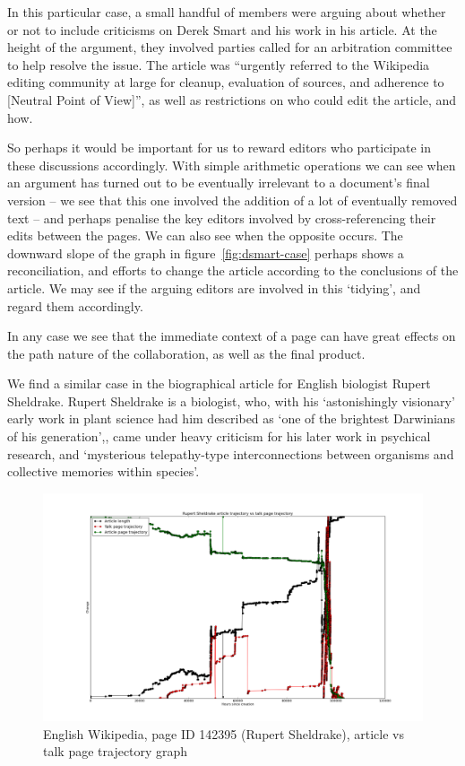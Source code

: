 In this particular case, a small handful of members were arguing about
whether or not to include criticisms on Derek Smart and his work in
his article. At the height of the argument, they involved parties
called for an arbitration committee to help resolve the issue. The
article was ``urgently referred to the Wikipedia editing community at
large for cleanup, evaluation of sources, and adherence to
[Neutral Point of View]'', as well as restrictions on who could edit
the article, and how.

So perhaps it would be important for us to reward editors who
participate in these discussions accordingly. With simple arithmetic
operations we can see when an argument has turned out to be eventually
irrelevant to a document's final version -- we see that this one
involved the addition of a lot of eventually removed text -- and
perhaps penalise the key editors involved by cross-referencing their
edits between the pages. We can also see when the opposite occurs. The
downward slope of the graph in figure~\ref{fig:dsmart-case}
perhaps shows a reconciliation, and efforts to change the article
according to the conclusions of the article. We may see if the arguing
editors are involved in this `tidying', and regard them accordingly.

In any case we see that the immediate context of a page can have great
effects on the path nature of the collaboration, as well as the final
product.

We find a similar case in the biographical article for English
biologist Rupert Sheldrake. Rupert Sheldrake is a biologist, who, with
his `astonishingly visionary' early work in plant science had him
described as `one of the brightest Darwinians of his
generation',\cite{odyssey-auxin}\cite{guardian-shel}, came under heavy
criticism for his later work in psychical research, and `mysterious
telepathy-type interconnections between organisms and collective
memories within species'.\cite{sheldrake-biog}

\begin{figure}
  \centering
  \centering
  \includegraphics[width=\linewidth]{img/rsheldrake/RupertSheldrakecombo.png}
  \caption{English Wikipedia, page ID 142395 (Rupert Sheldrake),
    article vs talk page trajectory graph}
  \label{fig:sheldrake-plot}
\end{figure}

